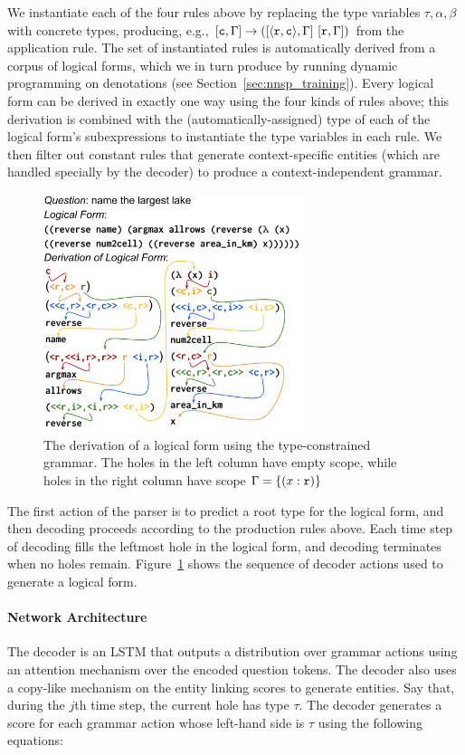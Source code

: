 We instantiate each of the four rules above by replacing the type variables 
$\tau, \alpha,\beta$ with concrete types, producing, e.g., $[\mathtt{c},\Gamma] 
\rightarrow ([\mathtt{\langle \mathtt{r},\mathtt{c} \rangle},\Gamma]~[\mathtt{r},\Gamma])$ from the application 
rule.
The set of instantiated rules is automatically derived from a corpus of logical 
forms, which we in turn produce by running dynamic programming on denotations 
(see Section~\ref{sec:nnsp_training}).
Every logical form can be derived in exactly one way using the four kinds of 
rules above; this derivation is combined with the (automatically-assigned) type 
of each of the logical form's subexpressions to instantiate the type variables 
in each rule.
We then filter out constant rules that generate context-specific entities 
(which are 
handled specially by the decoder) to produce a 
context-independent grammar.

\begin{figure}
\centering
\includegraphics[width=3in]{figures/nnsp_example_derivation.png}
\caption{The derivation of a logical form using the  type-constrained grammar. 
The holes in the left column have 
empty scope, while holes in the right column have scope $\Gamma = \{(x : 
\mathtt{r})\}$}\label{fig:grammar_derivation}
\end{figure}

The first action of the parser is to predict a root type for the logical form, 
and then decoding proceeds according to the production rules above.
Each time step of decoding fills the leftmost hole in the logical form, and 
decoding terminates when no holes remain.
Figure~\ref{fig:grammar_derivation} shows the sequence of decoder actions used 
to generate a logical form.

\paragraph{Network Architecture} The decoder is an LSTM that outputs a 
distribution over grammar actions using an attention mechanism over the encoded 
question tokens. The decoder also uses a copy-like mechanism on the entity 
linking scores to generate entities.
Say that, during the $j$th time step, the current hole has type $\tau$. The 
decoder generates a score for each grammar action whose left-hand side is 
$\tau$ using the following equations:


